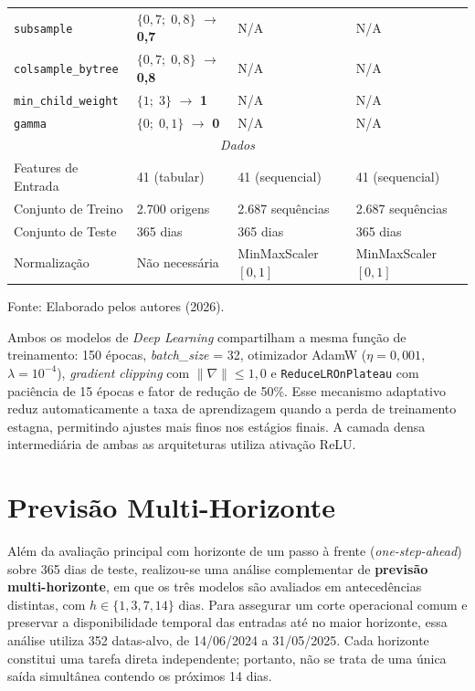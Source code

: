 \begin{table}[H]
\begin{center}
\begin{tabular}{p{4cm} p{2.8cm} p{2.8cm} p{2.8cm}}
\texttt{subsample} & $\{0{,}7;\; 0{,}8\}$ $\to$ \textbf{0,7} & N/A & N/A \\
\texttt{colsample\_bytree} & $\{0{,}7;\; 0{,}8\}$ $\to$ \textbf{0,8} & N/A & N/A \\
\texttt{min\_child\_weight} & $\{1;\; 3\}$ $\to$ \textbf{1} & N/A & N/A \\
\texttt{gamma} & $\{0;\; 0{,}1\}$ $\to$ \textbf{0} & N/A & N/A \\
\midrule
\multicolumn{4}{c}{\textit{Dados}} \\
\midrule
Features de Entrada & 41 (tabular) & 41 (sequencial) & 41 (sequencial) \\
Conjunto de Treino & 2.700 origens & 2.687 sequências & 2.687 sequências \\
Conjunto de Teste & 365 dias & 365 dias & 365 dias \\
Normalização & Não necessária & MinMaxScaler $[0,1]$ & MinMaxScaler $[0,1]$ \\
\bottomrule
\end{tabular}
\normalsize
\end{center}
\small{Fonte: Elaborado pelos autores (2026).}
\end{table}

Ambos os modelos de \textit{Deep Learning} compartilham a mesma função de treinamento: 150 épocas, \textit{batch\_size} = 32, otimizador AdamW ($\eta = 0{,}001$, $\lambda = 10^{-4}$), \textit{gradient clipping} com $\|\nabla\| \leq 1{,}0$ e \texttt{ReduceLROnPlateau} com paciência de 15 épocas e fator de redução de 50\%. Esse mecanismo adaptativo reduz automaticamente a taxa de aprendizagem quando a perda de treinamento estagna, permitindo ajustes mais finos nos estágios finais. A camada densa intermediária de ambas as arquiteturas utiliza ativação ReLU.

\section{Previsão Multi-Horizonte}\label{sec:previsao_x_dias}

Além da avaliação principal com horizonte de um passo à frente (\textit{one-step-ahead}) sobre 365 dias de teste, realizou-se uma análise complementar de \textbf{previsão multi-horizonte}, em que os três modelos são avaliados em antecedências distintas, com $h \in \{1, 3, 7, 14\}$ dias. Para assegurar um corte operacional comum e preservar a disponibilidade temporal das entradas até no maior horizonte, essa análise utiliza 352 datas-alvo, de 14/06/2024 a 31/05/2025. Cada horizonte constitui uma tarefa direta independente; portanto, não se trata de uma única saída simultânea contendo os próximos 14 dias.

